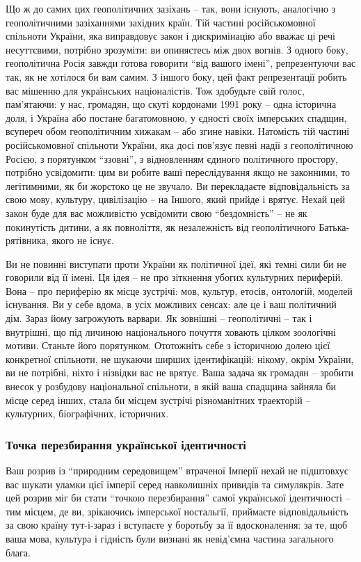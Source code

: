 Що ж до самих цих геополітичних зазіхань – так, вони існують, аналогічно з
геополітичними зазіханнями західних країн. Тій частині російськомовної
спільноти України, яка виправдовує закон і дискримінацію або вважає ці речі
несуттєвими, потрібно зрозуміти: ви опиняєтесь між двох вогнів. З одного боку,
геополітична Росія завжди готова говорити \enquote{від вашого імені}, репрезентуючи вас
так, як не хотілося би вам самим. З іншого боку, цей факт репрезентації робить
вас мішенню для українських націоналістів. Тож здобудьте свій голос,
пам'ятаючи: у нас, громадян, що скуті кордонами 1991 року – одна історична
доля, і Україна або постане багатомовною, у єдності своїх імперських спадщин,
всупереч обом геополітичним хижакам – або згине навіки. Натомість тій частині
російськомовної спільноти України, яка досі пов'язує певні надії з
геополітичною Росією, з порятунком \enquote{ззовні}, з відновленням єдиного політичного
простору, потрібно усвідомити: цим ви робите ваші переслідування якщо не
законними, то легітимними, як би жорстоко це не звучало. Ви перекладаєте
відповідальність за свою мову, культуру, цивілізацію – на Іншого, який прийде і
врятує. Нехай цей закон буде для вас можливістю усвідомити свою \enquote{бездомність} –
не як покинутість дитини, а як повноліття, як незалежність від геополітичного
Батька-рятівника, якого не існує. 

Ви не повинні виступати проти України як
політичної ідеї, які темні сили би не говорили від її імені. Ця ідея – не про
зіткнення убогих культурних периферій. Вона – про периферію як місце зустрічі:
мов, культур, етосів, онтологій, моделей існування. Ви у себе вдома, в усіх
можливих сенсах: але це і ваш політичний дім. Зараз йому загрожують варвари. Як
зовнішні – геополітичні – так і внутрішні, що під личиною національного почуття
ховають цілком зоологічні мотиви. Станьте його порятунком. Ототожніть себе з
історичною долею цієї конкретної спільноти, не шукаючи ширших ідентифікацій:
нікому, окрім України, ви не потрібні, ніхто і нізвідки вас не врятує. Ваша
задача як громадян – зробити внесок у розбудову національної спільноти, в якій
ваша спадщина зайняла би місце серед інших, стала би місцем зустрічі
різноманітних траекторій – культурних, біографічних, історичних. 

\subsubsection{Точка перезбирання української ідентичності}

Ваш розрив із \enquote{природним середовищем} втраченої Імперії нехай не
підштовхує вас шукати уламки цієї імперії серед навколишніх привидів та
симулякрів. Зате цей розрив міг би стати \enquote{точкою перезбирання} самої
української ідентичності – тим місцем, де ви, зрікаючись імперської ностальгії,
приймаєте відповідальність за свою країну тут-і-зараз і вступаєте у боротьбу за
її вдосконалення: за те, щоб ваша мова, культура і гідність були визнані як
невід'ємна частина загального блага.
